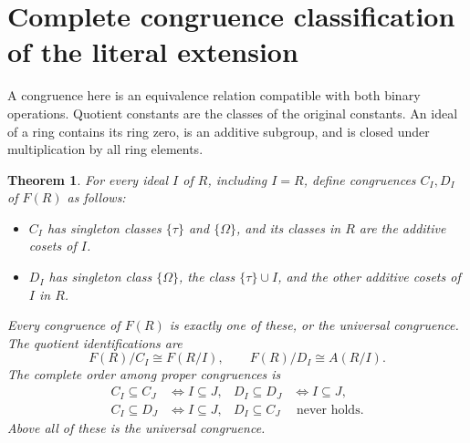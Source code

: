 \documentclass[11pt]{article}
\newtheorem{theorem}{Theorem}[section]
\theoremstyle{definition}
\newcommand{\Om}{\Omega}
\begin{document}
\section{Complete congruence classification of the literal extension}

A congruence here is an equivalence relation compatible with both binary
operations. Quotient constants are the classes of the original constants.
An ideal of a ring contains its ring zero, is an additive subgroup, and
is closed under multiplication by all ring elements.

\begin{theorem}\label{thm:congruences}
For every ideal \(I\) of \(R\), including \(I=R\), define congruences
\(C_I,D_I\) of \(F(R)\) as follows:
\begin{itemize}
\item \(C_I\) has singleton classes \(\{\tau\}\) and \(\{\Om\}\),
and its classes in \(R\) are the additive cosets of \(I\).
\item \(D_I\) has singleton class \(\{\Om\}\), the class
\(\{\tau\}\cup I\), and the other additive cosets of \(I\) in \(R\).
\end{itemize}
Every congruence of \(F(R)\) is exactly one of these, or the universal
congruence. The quotient identifications are
\[
 F(R)/C_I\cong F(R/I),\qquad F(R)/D_I\cong A(R/I).
\tag{10}\label{eq:congquotients}
\]
The complete order among proper congruences is
\[
\begin{aligned}
 C_I\subseteq C_J&\Longleftrightarrow I\subseteq J,&
 D_I\subseteq D_J&\Longleftrightarrow I\subseteq J,\\
 C_I\subseteq D_J&\Longleftrightarrow I\subseteq J,&
 D_I\subseteq C_J&\text{ never holds.}
\end{aligned}
\tag{11}\label{eq:congorder}
\]
Above all of these is the universal congruence.
\end{theorem}
\end{document}
